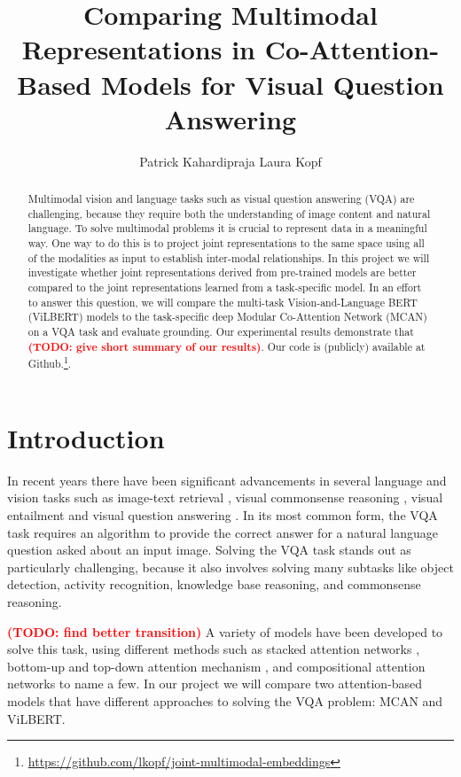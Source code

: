 \documentclass{article}
\title{Comparing Multimodal Representations in Co-Attention-Based Models for Visual Question Answering}
\author{%
   Patrick Kahardipraja%
  \And
   Laura Kopf \\
}
\newcommand{\todo}[1]{\textbf{\textcolor{Red}{(TODO: #1)}}}
\begin{document}
\maketitle


\begin{abstract}
Multimodal vision and language tasks such as visual question answering (VQA) are challenging, because they require both the understanding of image content and natural language. To solve multimodal problems it is crucial to represent data in a meaningful way. One way to do this is to project joint representations to the same space using all of the modalities as input to establish inter-modal relationships. In this project we will investigate whether joint representations derived from pre-trained models are better compared to the joint representations learned from a task-specific model. In an effort to answer this question, we will compare the multi-task Vision-and-Language BERT (ViLBERT) \citep{lu2020multitask} models to the task-specific deep Modular Co-Attention Network (MCAN) \citep{yu2019mcan} on a VQA task and evaluate grounding. Our experimental results demonstrate that \todo{give short summary of our results}. Our code is (publicly) available at Github.\footnote{\url{https://github.com/lkopf/joint-multimodal-embeddings}}.
\end{abstract}

\section{Introduction}

In recent years there have been significant advancements in several language and vision tasks such as image-text retrieval \citep{wang2016retrieval}, visual commonsense reasoning \citep{zellers2019vcr}, visual entailment \citep{xie2019entailment} and visual question answering \citep{antol2015vqa, malinowski2014vqa, ban, zhao2018vqa}. In its most common form, the VQA task requires an algorithm to provide the correct answer for a natural language question asked about an input image. Solving the VQA task stands out as particularly challenging, because it also involves solving many subtasks like object detection, activity recognition, knowledge base reasoning, and commonsense reasoning. 

\todo{find better transition}
A variety of models have been developed to solve this task, using different methods such as stacked attention networks \citep{yang2016vqa}, bottom-up and top-down attention mechanism \citep{Anderson_2018_CVPR}, and compositional attention networks \citep{hudson2018mac} to name a few. In our project we will compare two attention-based models that have different approaches to solving the VQA problem: MCAN and ViLBERT.
\end{document}
